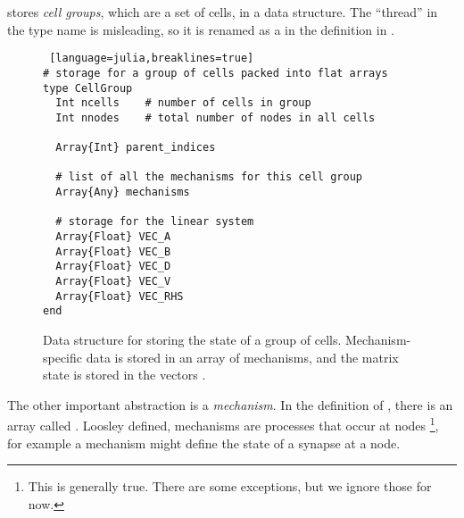 \neuron stores \emph{cell groups}, which are a set of cells, in a  data structure. The ``thread'' in the type name is misleading, so it is renamed as a  in the definition in .

\begin{figure}[htp!]
\begin{shaded}
\begin{lstlisting} [language=julia,breaklines=true]
# storage for a group of cells packed into flat arrays
type CellGroup
  Int ncells    # number of cells in group
  Int nnodes    # total number of nodes in all cells

  Array{Int} parent_indices

  # list of all the mechanisms for this cell group
  Array{Any} mechanisms

  # storage for the linear system
  Array{Float} VEC_A
  Array{Float} VEC_B
  Array{Float} VEC_D
  Array{Float} VEC_V
  Array{Float} VEC_RHS
end
\end{lstlisting}
\end{shaded}
\caption{Data structure for storing the state of a group of cells. Mechanism-specific data is stored in an array of mechanisms, and the matrix state is stored in the vectors .}
\label{fig:CellGroup}
\end{figure}

The other important abstraction is a \emph{mechanism}. In the definition of , there is an array called . Loosley defined, mechanisms are processes that occur at nodes \footnote{This is generally true. There are some exceptions, but we ignore those for now.}, for example a mechanism might define the state of a synapse at a node.


